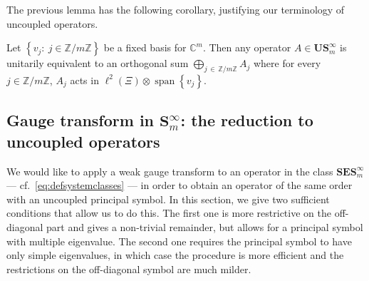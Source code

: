 \documentclass[AHL,Unicode,longabstracts,published]{cedram}
\DeclareMathOperator{\spann}{span}
\newcommand{\C}{\mathbb C}
\newcommand{\Z}{\mathbb Z}
\newcommand{\BE}{\mathbf E}
\newcommand{\BS}{\mathbf S}
\newcommand{\BU}{\mathbf U}
\newcommand{\set}[1]{\left\{ #1 \right\}}
\begin{document}
The previous lemma has the following corollary, justifying our terminology of uncoupled operators.
\begin{coro}
Let $\set{v_j:\ j\in\Z/m\Z}$ be a fixed basis for $\C^m$. Then any operator $A \in \BU\BS_m^\infty$ is unitarily equivalent to an orthogonal sum $\bigoplus_{j\,\in\,\Z/m\Z}A_j$ where for every $j\in\Z/m\Z$, $A_j$ acts in $\ell^2(\Xi) \otimes \spann\set{v_j}$.
\end{coro}


\subsection{Gauge transform in \texorpdfstring{$\BS_m^\infty$}{Sm}: the reduction to uncoupled operators} \label{sec:reducscalar}

We would like to apply a weak gauge transform to an operator in the class $\BS\BE\BS^\infty_m$\linebreak --- cf.~\eqref{eq:defsystemclasses} --- in order to obtain an operator of the same order with an uncoupled principal symbol. In this section, we give two sufficient conditions that allow us to do this. The first one is more restrictive on the off-diagonal part and gives a non-trivial remainder, but allows for a principal symbol with multiple eigenvalue. The second one requires the principal symbol to have only simple eigenvalues, in which case the procedure is more efficient and the restrictions on the off-diagonal symbol are much milder.
\end{document}
